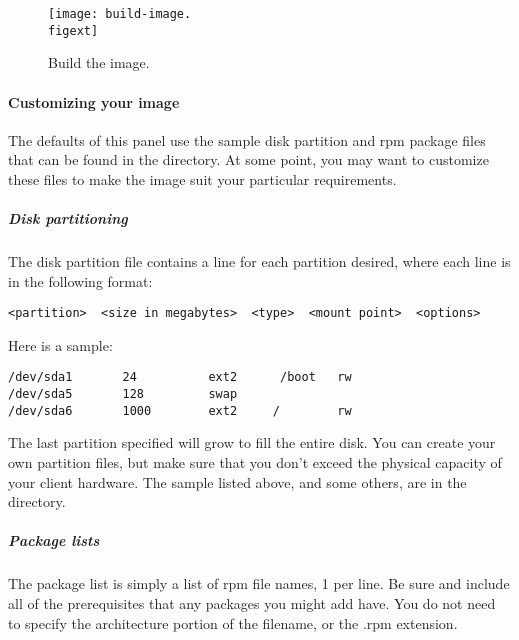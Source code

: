 \begin{figure}[htbp]
  \begin{center}
    \texttt{[image: build-image.\\figext]}
    \caption{Build the image.}
    \label{fig:detailed-build-image}
  \end{center}
\end{figure}
  
\paragraph{Customizing your image}

The defaults of this panel use the sample disk partition and rpm package files
that can be found in the  directory.
At some point, you may want to customize these files to make the image
suit your particular requirements.

\subparagraph{Disk partitioning}

The disk partition file contains a line for each partition desired, where
each line is in the following format:

\begin{verbatim}
<partition>  <size in megabytes>  <type>  <mount point>  <options>
\end{verbatim}

Here is a sample:

\begin{verbatim}
/dev/sda1       24          ext2      /boot   rw
/dev/sda5       128         swap
/dev/sda6       1000        ext2     /        rw
\end{verbatim}

The last partition specified will grow to fill the entire disk.
You can create your own partition files, but make sure that you
don't exceed the physical capacity of your client hardware. The sample
listed above, and some others, are in the  directory.

\subparagraph{Package lists}
The package list is simply a list of rpm file names, 1
per line. Be sure and include all of the prerequisites that
any packages you might add have. You do not need to specify
the architecture portion of the filename, or the .rpm extension.

